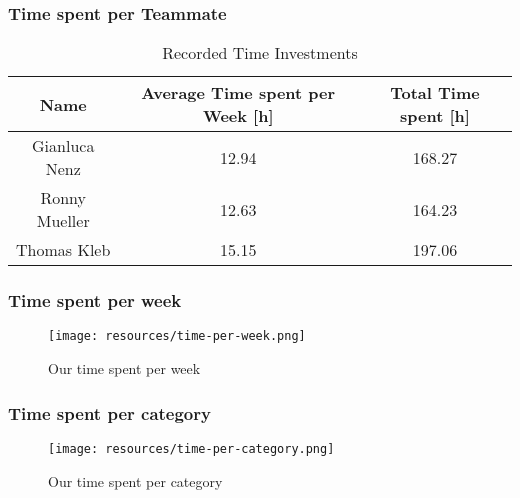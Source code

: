 \subsubsection*{Time spent per Teammate}
\begin{table}[H]
    \centering
    \begin{tabular}{||c c c||} 
        \hline
        Name & Average Time spent per Week [h] & Total Time spent [h]\\ [0.5ex] 
        \hline\hline
        Gianluca Nenz & 12.94 & 168.27 \\ 
        \hline
        Ronny Mueller & 12.63 & 164.23 \\
        \hline
        Thomas Kleb & 15.15 & 197.06 \\ 
        \hline
    \end{tabular}
    \caption{Recorded Time Investments}
    \label{time_ects_recorded}
\end{table}

\subsubsection*{Time spent per week}
\begin{figure}[H]
    \texttt{[image: resources/time-per-week.png]}
    \caption{Our time spent per week}
    \label{fig:timeperweek}
\end{figure}

\subsubsection*{Time spent per category}
\begin{figure}[H]
    \texttt{[image: resources/time-per-category.png]}
    \caption{Our time spent per category}
    \label{fig:timepercategory}
\end{figure}



